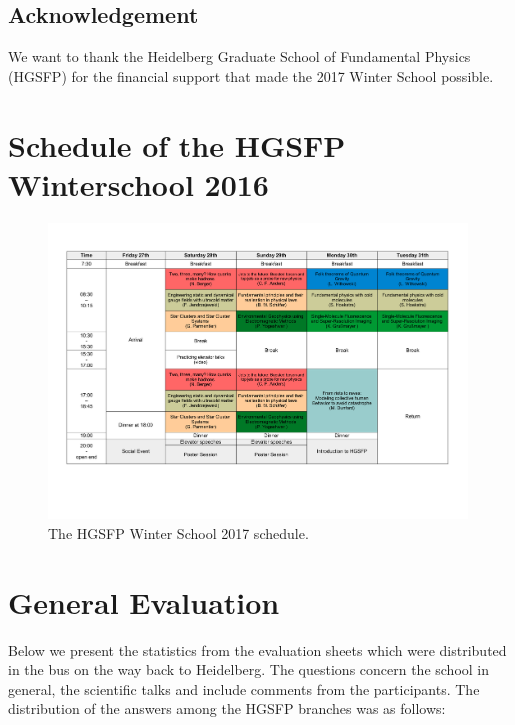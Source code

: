 \documentclass[11pt,a4paper]{article}
\numberwithin{equation}{section}
\numberwithin{table}{section}\setlength{\multlinegap}{25pt}
\begin{document}
\subsection*{Acknowledgement}

\noindent We want to thank the Heidelberg Graduate School of Fundamental Physics (HGSFP) for the financial support that made the 2017 Winter School possible.

\section{Schedule of the HGSFP Winterschool 2016}

\begin{figure}[H]
\centering
\vspace{-1.0cm}
\includegraphics[angle=90,width=0.99\textwidth]{FinalProgram.pdf}
\vspace{-1.0cm}
\caption{The HGSFP Winter School 2017 schedule.}
\end{figure}
\section{General Evaluation}
Below we present the statistics from the evaluation sheets which were distributed in the bus on the way back to Heidelberg. The questions concern the school in general, the scientific talks and include comments from the participants. The distribution of the answers among the HGSFP branches was as follows:
\end{document}
